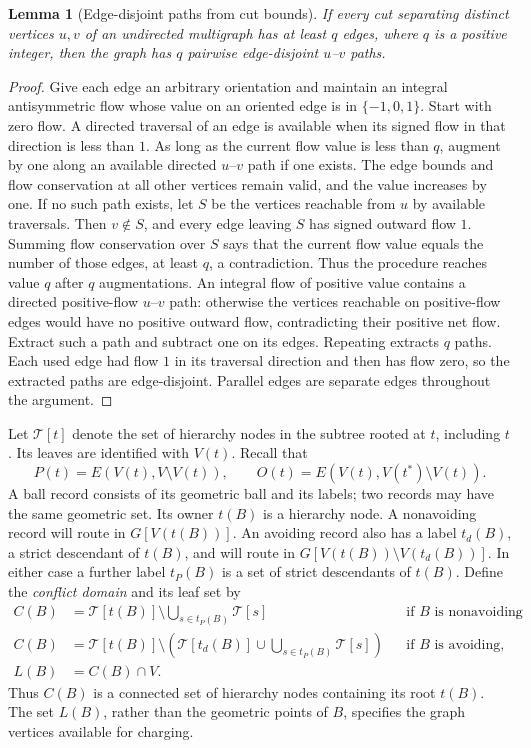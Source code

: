 \documentclass[11pt]{amsart}
\newtheorem{lemma}[theorem]{Lemma}
\theoremstyle{definition}
\theoremstyle{remark}
\numberwithin{equation}{section}
\begin{document}
\begin{lemma}[Edge-disjoint paths from cut bounds]\label{ha:edge-paths}
If every cut separating distinct vertices $u,v$ of an undirected
multigraph has at least $q$ edges, where $q$ is a positive integer,
then the graph has $q$ pairwise edge-disjoint $u$--$v$ paths.
\end{lemma}
\begin{proof}
Give each edge an arbitrary orientation and maintain an integral
antisymmetric flow whose value on an oriented edge is in
$\{-1,0,1\}$.  Start with zero flow.  A directed traversal of an edge
is available when its signed flow in that direction is less than
$1$.  As long as the current flow value is less than $q$, augment
by one along an available directed $u$--$v$ path if one exists.
The edge bounds and flow conservation at all other vertices remain
valid, and the value increases by one.
If no such path exists, let $S$ be the vertices reachable from $u$
by available traversals.  Then $v\notin S$, and every edge leaving
$S$ has signed outward flow $1$.  Summing flow conservation over
$S$ says that the current flow value equals the number of those
edges, at least $q$, a contradiction.  Thus the procedure reaches
value $q$ after $q$ augmentations.
An integral flow of positive value contains a directed positive-flow
$u$--$v$ path: otherwise the vertices reachable on positive-flow
edges would have no positive outward flow, contradicting their
positive net flow.  Extract such a path and subtract one on its
edges.  Repeating extracts $q$ paths.  Each used edge had flow $1$
in its traversal direction and then has flow zero, so the extracted
paths are edge-disjoint.  Parallel edges are separate edges
throughout the argument.
\end{proof}

Let $\mathcal T[t]$ denote the set of hierarchy nodes in the subtree
rooted at $t$, including $t$.  Its leaves are identified with $V(t)$.
Recall that
\[
 P(t)=E(V(t),V\setminus V(t)),\qquad
 O(t)=E(V(t),V(t^*)\setminus V(t)).
\]
A ball record consists of its geometric ball and its labels; two
records may have the same geometric set.  Its owner $t(B)$ is a
hierarchy node.  A nonavoiding record will route in $G[V(t(B))]$.
An avoiding record also has a label $t_d(B)$, a strict descendant of
$t(B)$, and will route in
$G[V(t(B))\setminus V(t_d(B))]$.  In either case a further label
$t_P(B)$ is a set of strict descendants of $t(B)$.  Define the
\emph{conflict domain} and its leaf set by
\begin{align*}
 C(B)&=\mathcal T[t(B)]\setminus
       \bigcup_{s\in t_P(B)}\mathcal T[s]
       &&\text{if $B$ is nonavoiding},\\
 C(B)&=\mathcal T[t(B)]\setminus
       \left(\mathcal T[t_d(B)]\cup
       \bigcup_{s\in t_P(B)}\mathcal T[s]\right)
       &&\text{if $B$ is avoiding},\\
 L(B)&=C(B)\cap V.
\end{align*}
Thus $C(B)$ is a connected set of hierarchy nodes containing its root
$t(B)$.  The set $L(B)$, rather than the geometric points of $B$,
specifies the graph vertices available for charging.
\end{document}
